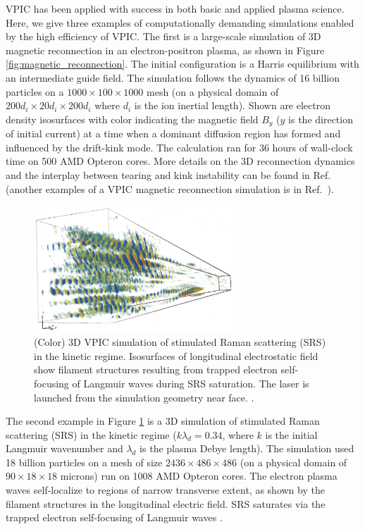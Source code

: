 \documentclass[aps,prl,preprint,preprintnumbers,groupedaddress]{revtex4}
\newcommand{\fig}[1]{Figure \ref{fig:#1}}
\begin{document}
VPIC has been applied with success in both basic and applied plasma
science.  Here, we give three examples of computationally demanding
simulations enabled by the high efficiency of VPIC.  The first is a
large-scale simulation of 3D magnetic reconnection in an
electron-positron plasma, as shown in \fig{magnetic_reconnection}.
The initial configuration is a Harris equilibrium with an intermediate
guide field.  The simulation follows the dynamics of 16 billion
particles on a $1000\times100\times1000$ mesh (on a physical domain of
$200d_i\times20d_i\times200d_i$ where $d_i$ is the ion inertial
length).  Shown are electron density isosurfaces with color indicating
the magnetic field $B_y$ ($y$ is the direction of initial current) at
a time when a dominant diffusion region has formed and influenced by
the drift-kink mode.  The calculation ran for 36 hours of wall-clock
time on 500 AMD Opteron cores. More details on the 3D reconnection
dynamics and the interplay between tearing and kink instability can be
found in Ref.~\cite{Yin_et_al_PRL_2007_reconnection} (another examples of
a VPIC magnetic reconnection simulation is in
Ref.~\cite{Bowers_Li_PRL_2007}).

\begin{figure}
\centering
\includegraphics[width=75mm]{stimulated_raman_scattering.eps}
\caption{\label{fig:stimulated_raman_scattering}
(Color) 3D VPIC simulation of stimulated Raman scattering (SRS) in the
kinetic regime.  Isosurfaces of longitudinal electrostatic field show
filament structures resulting from trapped electron self-focusing of
Langmuir waves during SRS saturation.  The laser is launched from the
simulation geometry near face.
\cite{Yin_et_al_Phys_Plasmas_2007_SRS}.}
\end{figure}

The second example in \fig{stimulated_raman_scattering} is a 3D
simulation of stimulated Raman scattering (SRS) in the kinetic regime
($k \lambda_d = 0.34$, where $k$ is the initial Langmuir wavenumber
and $\lambda_d$ is the plasma Debye length).  The simulation used 18
billion particles on a mesh of size $2436 \times 486 \times 486$ (on a
physical domain of $90\times18\times18$ microns) run on 1008 AMD
Opteron cores.  The electron plasma waves self-localize to regions of
narrow transverse extent, as shown by the filament structures in the
longitudinal electric field.  SRS saturates via the trapped electron
self-focusing of Langmuir waves
\cite{Yin_et_al_Phys_Plasmas_2007_SRS}.
\end{document}
